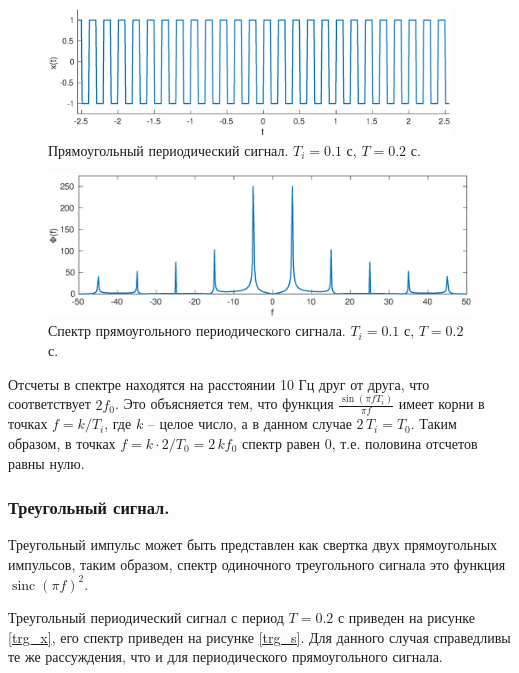 \documentclass[a4paper,14pt]{extarticle}
\DeclareMathOperator{\sinc}{sinc}
\begin{document}
\begin{figure}[H]
\includegraphics[width=0.95\textwidth]{sqr_x.eps}
\captionsetup{justification=centering,margin=0cm}
\caption{Прямоугольный периодический сигнал. $T_i = 0.1$ с, $T = 0.2$ с.}
\label{sqr_x}
\end{figure}

\begin{figure}[H]
\includegraphics[width=1\textwidth]{sqr_s.eps}
\captionsetup{justification=centering,margin=1cm}
\caption{Спектр прямоугольного периодического сигнала. $T_i = 0.1$ с, $T = 0.2$ с. }
\label{sqr_s}
\end{figure}


Отсчеты в спектре находятся на расстоянии 10 Гц друг от друга, что соответствует $2f_0$. Это объясняется тем, что функция $\frac{\sin(\pi f T_i)}{\pi f}$ имеет корни в точках $f = k/T_i$, где $k$ -- целое число, а в данном случае $2\,T_i = T_0$. Таким образом, в точках $f = k \cdot 2/T_0 =  2 \, k f_0$ спектр равен 0, т.е. половина отсчетов равны нулю.

\subsubsection{Треугольный сигнал.}
Треугольный импульс может быть представлен как свертка двух прямоугольных импульсов, таким образом, спектр одиночного треугольного сигнала это функция $\sinc(\pi f)^2$.

Треугольный периодический сигнал с период $T = 0.2$ с приведен на рисунке \ref{trg_x}, его спектр приведен на рисунке \ref{trg_s}. Для данного случая справедливы те же рассуждения, что и для периодического прямоугольного сигнала.
\end{document}
